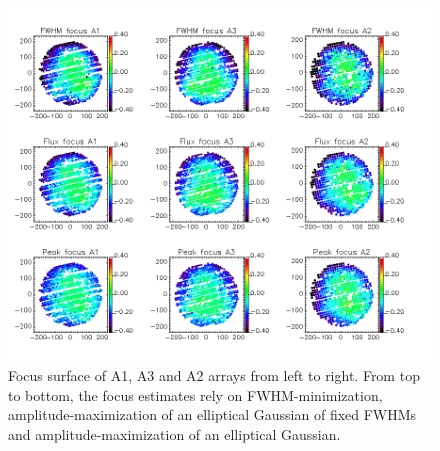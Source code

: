 \begin{figure}
\begin{center}
  \includegraphics[trim={0, 1cm, 0, 1cm}, clip, angle=0, scale=0.5]{Figures/fov_focus_mv_5.png}
\caption[Focus surfaces]{Focus surface of A1, A3 and A2 arrays from left to
  right. From top to bottom, the focus estimates rely on
  FWHM-minimization, amplitude-maximization of an elliptical
  Gaussian of fixed FWHMs and amplitude-maximization of an elliptical
  Gaussian.}
\label{fig:focus-surfaces}
\end{center}
\end{figure}

